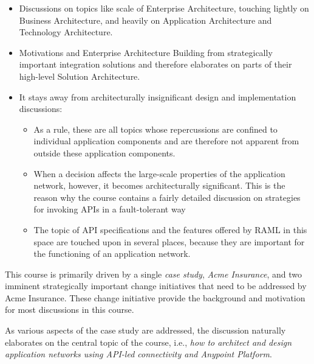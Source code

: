 \begin{mdframed}[backgroundcolor=yellow]
	
	\begin{itemize}
		\item Discussions on topics like scale of Enterprise Architecture, touching lightly on Business Architecture, and heavily on Application Architecture and Technology Architecture.
		\item Motivations and Enterprise Architecture Building from strategically important integration solutions and therefore elaborates on parts of their high-level Solution Architecture. 
		\item It stays away from architecturally insignificant design and implementation discussions: 
		\begin{itemize}
			\item As a rule, these are all topics whose repercussions are confined to individual application components and are therefore not apparent from outside these application components. 
			\item When a decision affects the large-scale properties of the application network, however, it becomes architecturally significant. This is the reason why the course contains a fairly detailed discussion on strategies for invoking APIs in a fault-tolerant way
			\item The topic of API specifications and the features offered by RAML in this space are touched upon in several places, because they are important for the functioning of an application network.
		\end{itemize}	
	\end{itemize}
	
	This course is primarily driven by a single \textit{case study}, \textit{Acme Insurance}, and two imminent strategically important change initiatives that need to be addressed by Acme Insurance. These change initiative provide the background and motivation for most discussions in this course.
	
	As various aspects of the case study are addressed, the discussion naturally elaborates on the central topic of the course, i.e., \textit{how to architect and design application networks using API-led connectivity and Anypoint Platform}.
	
\end{mdframed}



